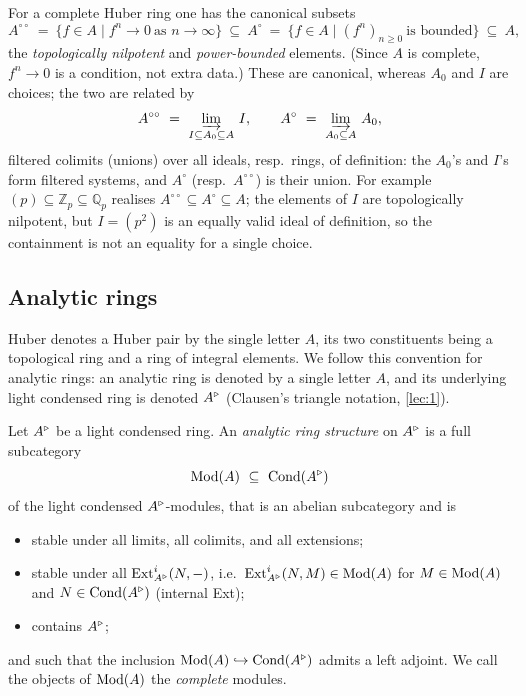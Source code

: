 For a complete Huber ring one has the canonical subsets
\begin{equation}
\label{eq:8:Aoo-Acirc}
A^{\circ\circ}\ =\ \{f\in A\mid f^{n}\to0\ \text{as }n\to\infty\}
\ \subseteq\
A^{\circ}\ =\ \{f\in A\mid (f^{n})_{n\ge0}\ \text{is bounded}\}
\ \subseteq\ A,
\end{equation}
the \emph{topologically nilpotent} and \emph{power-bounded} elements. (Since $A$
is complete, $f^{n}\to0$ is a condition, not extra data.) These are canonical,
whereas $A_{0}$ and $I$ are choices; the two are related by
\begin{equation*}
A^{\circ\circ}\ =\ \varinjlim_{I\subseteq A_{0}\subseteq A}\, I,
\qquad
A^{\circ}\ =\ \varinjlim_{A_{0}\subseteq A}\, A_{0},
\end{equation*}
filtered colimits (unions) over all ideals, resp.\ rings, of definition: the
$A_{0}$'s and $I$'s form filtered systems, and $A^{\circ}$ (resp.\
$A^{\circ\circ}$) is their union. For example $(p)\subseteq\mathbb{Z}_p\subseteq
\mathbb{Q}_p$ realises $A^{\circ\circ}\subseteq A^{\circ}\subseteq A$; the
elements of $I$ are topologically nilpotent, but $I=(p^{2})$ is an equally valid
ideal of definition, so the containment is not an equality for a single choice.

\subsection{Analytic rings}

\begin{notation}
\label{not:8:single-letter}
\ts{00:20:41}
Huber denotes a Huber pair by the single letter $A$, its two constituents being a
topological ring and a ring of integral elements. We follow this convention for
analytic rings: an analytic ring is denoted by a single letter $A$, and its
underlying light condensed ring is denoted $A^{\triangleright}$ (Clausen's triangle notation,
\cref{lec:1}).
\end{notation}

\begin{definition}
\label{def:8:analytic-ring}
\ts{00:22:11}
Let $A^{\triangleright}$ be a light condensed ring. An \emph{analytic ring structure} on
$A^{\triangleright}$ is a full subcategory
\begin{equation*}
\Mod(A)\ \subseteq\ \Cond(\ur A)
\end{equation*}
of the light condensed $A^{\triangleright}$-modules, that is an abelian subcategory and is
\begin{itemize}
\item stable under all limits, all colimits, and all extensions;
\item stable under all $\operatorname{Ext}^{i}_{A^{\triangleright}}(N,-)$, i.e.\ $\operatorname{Ext}^{i}_{A^{\triangleright}}(N,M)\in
\operatorname{Mod}(A)$ for $M\in\operatorname{Mod}(A)$ and $N\in\operatorname{Cond}(A^{\triangleright})$ (internal Ext);
\item contains $A^{\triangleright}$;
\end{itemize}
and such that the inclusion $\operatorname{Mod}(A)\hookrightarrow\operatorname{Cond}(A^{\triangleright})$ admits a left
adjoint. We call the objects of $\operatorname{Mod}(A)$ the \emph{complete} modules.
\end{definition}

